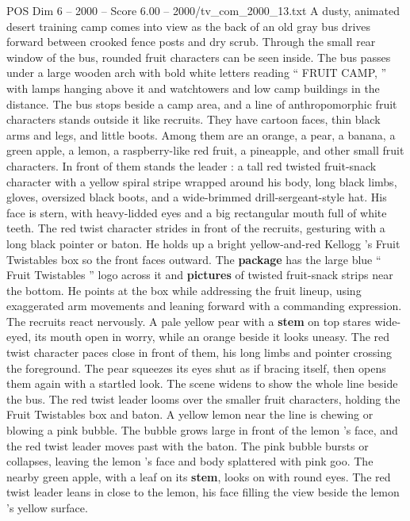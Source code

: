 \begin{textsample}{POS Dim 6 – 2000 – Score 6.00 – 2000/tv\_com\_2000\_13.txt}  \label{ex:f6_pos_060}
A dusty, animated desert training camp comes into view as the back of an old gray bus drives forward between crooked fence posts and dry scrub.
Through the small rear window of the bus, rounded fruit characters can be seen inside.
The bus passes under a large wooden arch with bold white letters reading “ FRUIT CAMP, ” with lamps hanging above it and watchtowers and low camp buildings in the distance.
The bus stops beside a camp area, and a line of anthropomorphic fruit characters stands outside it like recruits.
They have cartoon faces, thin black arms and legs, and little boots.
Among them are an orange, a pear, a banana, a green apple, a lemon, a raspberry-like red fruit, a pineapple, and other small fruit characters.
In front of them stands the leader : a tall red twisted fruit-snack character with a yellow spiral stripe wrapped around his body, long black limbs, gloves, oversized black boots, and a wide-brimmed drill-sergeant-style hat.
His face is stern, with heavy-lidded eyes and a big rectangular mouth full of white teeth.
The red twist character strides in front of the recruits, gesturing with a long black pointer or baton.
He holds up a bright yellow-and-red Kellogg ’s Fruit Twistables box so the front faces outward.
The \textbf{package} has the large blue “ Fruit Twistables ” logo across it and \textbf{pictures} of twisted fruit-snack strips near the bottom.
He points at the box while addressing the fruit lineup, using exaggerated arm movements and leaning forward with a commanding expression.
The recruits react nervously.
A pale yellow pear with a \textbf{stem} on top stares wide-eyed, its mouth open in worry, while an orange beside it looks uneasy.
The red twist character paces close in front of them, his long limbs and pointer crossing the foreground.
The pear squeezes its eyes shut as if bracing itself, then opens them again with a startled look.
The scene widens to show the whole line beside the bus.
The red twist leader looms over the smaller fruit characters, holding the Fruit Twistables box and baton.
A yellow lemon near the line is chewing or blowing a pink bubble.
The bubble grows large in front of the lemon ’s face, and the red twist leader moves past with the baton.
The pink bubble bursts or collapses, leaving the lemon ’s face and body splattered with pink goo.
The nearby green apple, with a leaf on its \textbf{stem}, looks on with round eyes.
The red twist leader leans in close to the lemon, his face filling the view beside the lemon ’s yellow surface.

\end{textsample}
